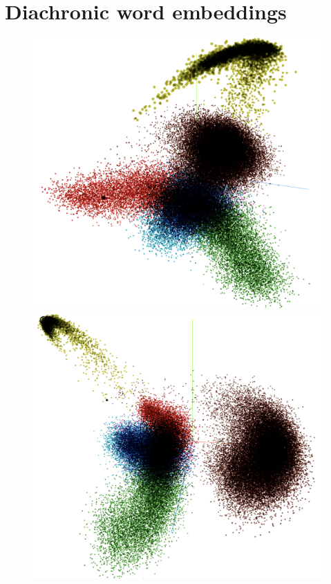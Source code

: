 \section{Diachronic word embeddings}
\begin{figure}[H]
  \centering
  \begin{minipage}[b]{0.45\linewidth}
    \includegraphics[width=\textwidth]{figures_new/from_old/pca_embedding_projector}
  \end{minipage}
  \quad
  \begin{minipage}[b]{0.45\linewidth}
    \includegraphics[width=\textwidth]{figures_new/from_old/pca_embedding_projector_2}

\end{minipage}
\end{figure}
